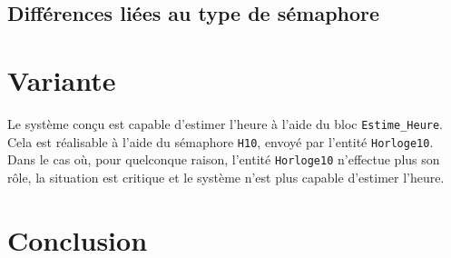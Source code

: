 \documentclass[french]{article}
\begin{document}
	\subsection{Différences liées au type de sémaphore}
	
	\section{Variante}
	
	Le système conçu est capable d'estimer l'heure à l'aide du bloc \texttt{Estime\_Heure}. Cela est réalisable à l'aide du sémaphore \texttt{H10}, envoyé par l'entité \texttt{Horloge10}. Dans le cas où, pour quelconque raison, l'entité \texttt{Horloge10} n'effectue plus son rôle, la situation est critique et le système n'est plus capable d'estimer l'heure.

	\section{Conclusion}

	
\end{document}
